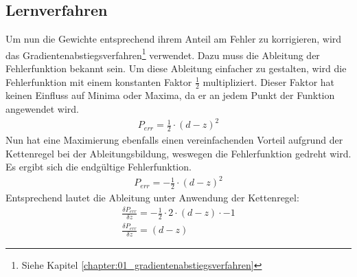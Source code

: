 \subsection{Lernverfahren}
Um nun die Gewichte entsprechend ihrem Anteil am Fehler zu korrigieren, wird das Gradientenabstiegsverfahren\footnote{Siehe Kapitel \ref{chapter:01_gradientenabstiegsverfahren}}
verwendet. Dazu muss die Ableitung der Fehlerfunktion bekannt sein. Um diese Ableitung einfacher zu gestalten,
wird die Fehlerfunktion mit einem konstanten Faktor $\frac{1}{2}$ multipliziert. Dieser Faktor hat keinen Einfluss
auf Minima oder Maxima, da er an jedem Punkt der Funktion angewendet wird.
\begin{align}
    P_{err} = \frac{1}{2} \cdot (d - z)^2
\end{align}
Nun hat eine Maximierung ebenfalls einen vereinfachenden Vorteil aufgrund der Kettenregel bei der Ableitungsbildung,
weswegen die Fehlerfunktion gedreht wird. Es ergibt sich die endgültige Fehlerfunktion.
\begin{align}
    P_{err} = -\frac{1}{2} \cdot (d - z)^2
\end{align}
Entsprechend lautet die Ableitung unter Anwendung der Kettenregel:
\begin{align}
    \frac{\delta P_{err}}{\delta z} = - \frac{1}{2} \cdot 2 \cdot (d - z) \cdot -1\\
    \frac{\delta P_{err}}{\delta z} = (d - z)
\end{align}

